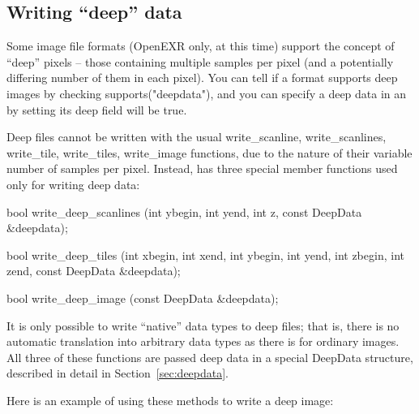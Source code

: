 \subsection{Writing ``deep'' data}
\label{sec:imageoutput:deepdata}  
Some image file formats (OpenEXR only, at this time) support the concept
of ``deep'' pixels -- those containing multiple samples per pixel (and a
potentially differing number of them in each pixel).  You can tell
if a format supports deep images by checking {\cf supports("deepdata")},
and you can specify a deep data in an \ImageSpec by setting its {\cf deep}
field will be {\cf true}.

Deep files cannot be written with the usual {\cf write_scanline}, {\cf
  write_scanlines}, {\cf write_tile}, {\cf write_tiles}, {\cf write_image}
functions, due to the nature of their variable number of samples per
pixel.  Instead, \ImageOutput has three special member functions used
only for writing deep data:

\begin{code}
    bool write_deep_scanlines (int ybegin, int yend, int z,
                               const DeepData &deepdata);

    bool write_deep_tiles (int xbegin, int xend, int ybegin, int yend,
                           int zbegin, int zend, const DeepData &deepdata);

    bool write_deep_image (const DeepData &deepdata);
\end{code}

It is only possible to write ``native'' data types to deep files; that
is, there is no automatic translation into arbitrary data types as there
is for ordinary images.  All three of these functions are passed
deep data in a special {\cf DeepData} structure, described in
detail in Section~\ref{sec:deepdata}.


\noindent Here is an example of using these methods to write a deep image:

